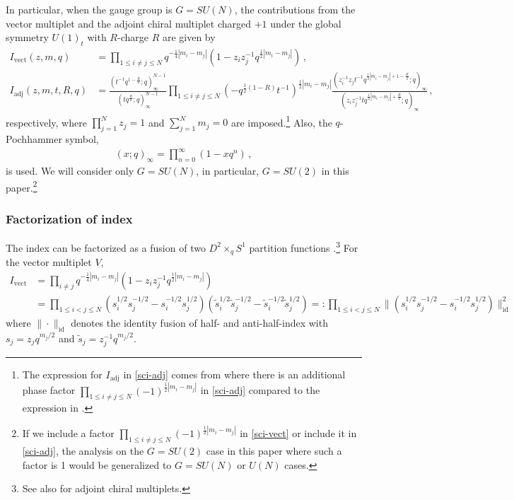 \documentclass[11pt,hyper,a4paper]{article}
\begin{document}
In particular, when the gauge group is $G=SU(N)$, the contributions from the vector multiplet and the adjoint chiral multiplet charged $+1$ under the global symmetry $U(1)_t$ with $R$-charge $R$ are given by
\begin{align}
I_{\text{vect}} (z,m,q) &= \prod_{1\leq i \neq j \leq N} q^{-\frac{1}{4} |m_i-m_j|} (1- z_i z_j^{-1} q^{\frac{1}{2} |m_i-m_j|})	\,	,	\label{sci-vect}	\\
I_{\text{adj}} (z,m,t, R, q) &=  \frac{( t^{-1} q^{ 1 -\frac{R}{2} };q)^{N-1}_\infty}{( t  q^{\frac{R}{2} };q)_\infty^{N-1}} 
\prod_{1 \leq i \neq j \leq N} (-q^{\frac{1}{2} (1-R)} t^{-1})^{\frac{1}{2} |m_i-m_j|} \frac{(z_i^{-1} z_j t^{-1} q^{\frac{1}{2} |m_i-m_j| +1 -\frac{R}{2} };q)_\infty}{(z_i z_j^{-1} t  q^{\frac{1}{2} |m_i-m_j| +\frac{R}{2} };q)_\infty}	\,	,	\label{sci-adj}
\end{align}
respectively, where $\prod_{j=1}^N z_j=1$ and $\sum_{j=1}^N m_j = 0$ are imposed.\footnote{The expression for $I_{\text{adj}}$ in \eqref{sci-adj} comes from \cite{Dimofte-Gaiotto-Gukov-index, Beem-Dimofte-Pasquetti} where there is an additional phase factor $\prod_{1 \leq i \neq j \leq N} (-1)^{\frac{1}{2}|m_i-m_j|}$ in \eqref{sci-adj} compared to the expression in \cite{Imamura-Yokoyama, Kapustin-Willett}.
}
Also, the $q$-Pochhammer symbol,
\begin{align}
(x;q)_\infty = \prod_{n=0}^{\infty} (1-xq^n)	\,	,
\end{align} is used.
We will consider only $G=SU(N)$, in particular, $G=SU(2)$ in this paper.\footnote{If we include a factor $\prod_{1 \leq i \neq j \leq N}(-1)^{\frac{1}{2}|m_i-m_j|}$ in \eqref{sci-vect} or include it in \eqref{sci-adj}, the analysis on the $G=SU(2)$ case in this paper where such a factor is 1 would be generalized to $G=SU(N)$ or $U(N)$ cases.}	





\subsubsection*{Factorization of index}

The index can be factorized as a fusion of two $D^2 \times_q S^1$ partition functions \cite{Beem-Dimofte-Pasquetti,Pasquetti-3d}.\footnote{See also \cite{Hwang-Park} for adjoint chiral multiplets.}
For the vector multiplet $V$,
\begin{align}
I_{\text{vect}} &= \prod_{i \neq j} q^{-\frac{1}{4}|m_i - m_j|} (1-z_i z_j^{-1} q^{\frac{1}{2} |m_i-m_j| }) 	\label{vect-ind}	\\
&= \prod_{1 \leq i <j \leq N} (s_i^{1/2} s_j^{-1/2} -s_i^{-1/2} s_j^{1/2}) (\tilde{s}_i^{1/2} \tilde{s}_j^{-1/2} -\tilde{s}_i^{-1/2} \tilde{s}_j^{1/2})
=: \prod_{1 \leq i <j \leq N} \| (s_i^{1/2} s_j^{-1/2} -s_i^{-1/2} s_j^{1/2}) \|_{\text{id}}^2	\label{vect-factor}
\end{align}
where $\| \cdot \|_{\text{id}}$ denotes the identity fusion \cite{Beem-Dimofte-Pasquetti} of half- and anti-half-index with $s_j = z_j q^{m_j/2}$ and $\tilde{s}_j = z_j^{-1} q^{m_j/2}$.	\\
\end{document}
